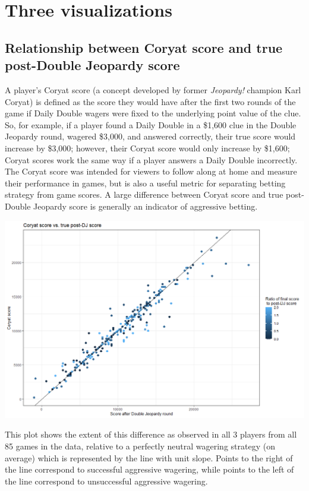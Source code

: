 \documentclass{article}
\begin{document}
\section{Three visualizations}

\subsection{Relationship between Coryat score and true post-Double Jeopardy score}

A player's Coryat score (a concept developed by former \textit{Jeopardy!} champion Karl Coryat) is defined as the score they would have after the first two rounds of the game if Daily Double wagers were fixed to the underlying point value of the clue. So, for example, if a player found a Daily Double in a \$1,600 clue in the Double Jeopardy round, wagered \$3,000, and answered correctly, their true score would increase by \$3,000; however, their Coryat score would only increase by \$1,600; Coryat scores work the same way if a player answers a Daily Double incorrectly. The Coryat score was intended for viewers to follow along at home and measure their performance in games, but is also a useful metric for separating betting strategy from game scores. A large difference between Coryat score and true post-Double Jeopardy score is generally an indicator of aggressive betting.

\smallskip

\includegraphics[width=\textwidth]{PS6a_Mondry.png}

\smallskip

This plot shows the extent of this difference as observed in all 3 players from all 85 games in the data, relative to a perfectly neutral wagering strategy (on average) which is represented by the line with unit slope. Points to the right of the line correspond to successful aggressive wagering, while points to the left of the line correspond to unsuccessful aggressive wagering.
\end{document}
